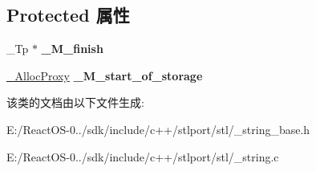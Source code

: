 \subsection*{Protected 属性}
\begin{DoxyCompactItemize}
\item 
\mbox{\label{class___string__base_ab5fc69366ecbc5c8df9700b46d0cbd6e}} 
\+\_\+\+Tp $\ast$ {\bfseries \+\_\+\+M\+\_\+finish}
\item 
\mbox{\label{class___string__base_a18a36b3a625e7d326fd0b89cd44c68df}} 
\hyperlink{class___s_t_l_p__alloc__proxy}{\+\_\+\+Alloc\+Proxy} {\bfseries \+\_\+\+M\+\_\+start\+\_\+of\+\_\+storage}
\end{DoxyCompactItemize}


该类的文档由以下文件生成\+:\begin{DoxyCompactItemize}
\item 
E\+:/\+React\+O\+S-\/0../sdk/include/c++/stlport/stl/\+\_\+string\+\_\+base.\+h\item 
E\+:/\+React\+O\+S-\/0../sdk/include/c++/stlport/stl/\+\_\+string.\+c\end{DoxyCompactItemize}
